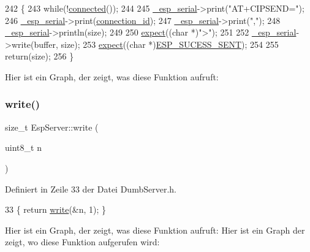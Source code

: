 \begin{DoxyCode}
242 \{
243   \textcolor{keywordflow}{while}(!\hyperlink{class_esp_server_a6a25e008ded89de0e4599df7170008fb}{connected}());
244 
245   \hyperlink{class_esp_server_a33166aa92db341d47cdf1776492cca62}{\_esp\_serial}->print(\textcolor{stringliteral}{"AT+CIPSEND="});
246   \hyperlink{class_esp_server_a33166aa92db341d47cdf1776492cca62}{\_esp\_serial}->print(\hyperlink{class_esp_server_ab601ba8cdf21497e04e862f22e52c590}{connection\_id});
247   \hyperlink{class_esp_server_a33166aa92db341d47cdf1776492cca62}{\_esp\_serial}->print(\textcolor{stringliteral}{","});
248   \hyperlink{class_esp_server_a33166aa92db341d47cdf1776492cca62}{\_esp\_serial}->println(size);
249 
250   \hyperlink{class_esp_server_a2008f0d315cff00a4bcc1120eeb2dc95}{expect}((\textcolor{keywordtype}{char} *)\textcolor{stringliteral}{">"});
251 
252   \hyperlink{class_esp_server_a33166aa92db341d47cdf1776492cca62}{\_esp\_serial}->write(buffer, size);
253   \hyperlink{class_esp_server_a2008f0d315cff00a4bcc1120eeb2dc95}{expect}((\textcolor{keywordtype}{char} *)\hyperlink{_dumb_server_8cpp_a3df41d167aea12431009366bf32f28b3}{ESP\_SUCESS\_SENT});
254 
255   \textcolor{keywordflow}{return}(size);
256 \}
\end{DoxyCode}
Hier ist ein Graph, der zeigt, was diese Funktion aufruft\+:
\mbox{\label{class_esp_server_aecc7262ee265fd78affe24f35e49e1bb}} 
\subsubsection{\texorpdfstring{write()}{write()}\hspace{0.1cm}{\footnotesize\ttfamily [2/6]}}
{\footnotesize\ttfamily size\+\_\+t Esp\+Server\+::write (\begin{DoxyParamCaption}\item[{uint8\+\_\+t}]{n }\end{DoxyParamCaption})\hspace{0.3cm}{\ttfamily [inline]}}



Definiert in Zeile 33 der Datei Dumb\+Server.\+h.


\begin{DoxyCode}
33 \{ \textcolor{keywordflow}{return} \hyperlink{class_esp_server_a0756c42343195dd1d1aa2f61c9b095bf}{write}(&n, 1); \}
\end{DoxyCode}
Hier ist ein Graph, der zeigt, was diese Funktion aufruft\+:
Hier ist ein Graph der zeigt, wo diese Funktion aufgerufen wird\+:
\mbox{\label{class_esp_server_ae3ba71ceb4df9357d8e258efe3e79f4d}} 
